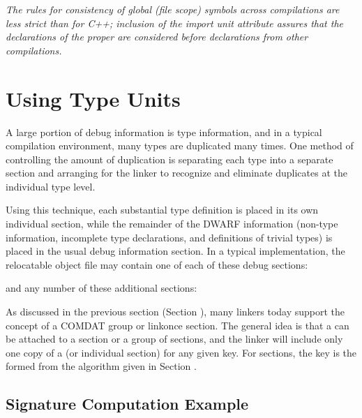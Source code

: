 \textit{The  rules for consistency of global (file scope) symbols
across compilations are less strict than for C++; inclusion
of the import unit attribute assures that the declarations of
the proper  are considered before declarations
from other compilations.}


\section{Using Type Units}
\label{app:usingtypeunits}

A large portion of debug information is type information, and
in a typical compilation environment, many types are duplicated
many times. One method of controlling the amount of duplication
is separating each type into a separate 
\dotdebugtypes{} section
and arranging for the linker to recognize and eliminate
duplicates at the individual type level.

Using this technique, each substantial type definition is
placed in its own individual section, while the remainder
of the DWARF information (non-type information, incomplete
type declarations, and definitions of trivial types) is
placed in the usual debug information section. In a typical
implementation, the relocatable object file may contain one
of each of these debug sections:

\begin{alltt}
\dotdebugabbrev{}
\dotdebuginfo{}
\dotdebugline{}
\end{alltt}

and any number of these additional sections:

\begin{alltt}
\dotdebugtypes{}
\end{alltt}

As discussed in the previous section 
(Section ), 
many
linkers today support the concept of a COMDAT group or
linkonce section. The general idea is that a  can be
attached to a section or a group of sections, and the linker
will include only one copy of a 
(or individual section) for any given key. 
For 
\dotdebugtypes{} sections, the
key is the 
formed from the algorithm given in
Section .

\subsection{Signature Computation Example}
\label{app:signaturecomputationexample}

